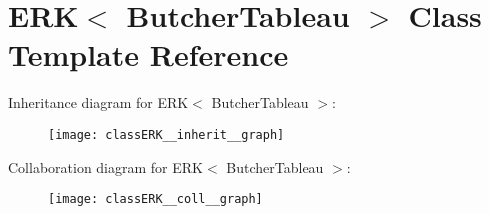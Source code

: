 \hypertarget{classERK}{}\section{E\+RK$<$ Butcher\+Tableau $>$ Class Template Reference}
\label{classERK}


Inheritance diagram for E\+RK$<$ Butcher\+Tableau $>$\+:\nopagebreak
\begin{figure}[H]
\begin{center}
\leavevmode
\texttt{[image: classERK\_\_inherit\_\_graph]}
\end{center}
\end{figure}


Collaboration diagram for E\+RK$<$ Butcher\+Tableau $>$\+:\nopagebreak
\begin{figure}[H]
\begin{center}
\leavevmode
\texttt{[image: classERK\_\_coll\_\_graph]}
\end{center}
\end{figure}
